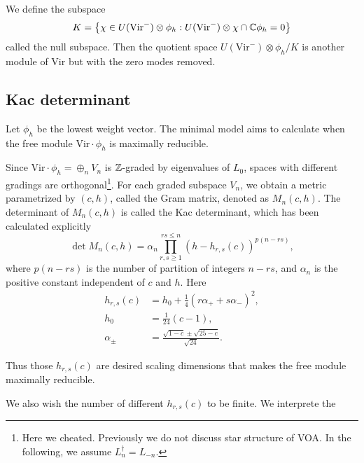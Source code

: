 \documentclass{article}
\begin{document}
We define the subspace
\[
K = \left\{\chi\in  U(\mathrm{Vir}^-)\otimes \phi_h: U(\mathrm{Vir}^-)\otimes \chi\cap \mathbb{C}\phi_h = 0\right\}
\]
called the null subspace. Then the quotient space $U(\mathrm{Vir}^-)\otimes \phi_h/K$ is another module of $\mathrm{Vir}$ but with the zero modes removed.

\subsection{Kac determinant}
Let $\phi_h$ be the lowest weight vector. The minimal model aims to calculate when the free module $\mathrm{Vir}\cdot \phi_h$ is maximally reducible. 

Since $\mathrm{Vir}\cdot \phi_h = \oplus_{n}V_n$ is $\mathbb{Z}$-graded by eigenvalues of $L_0$, spaces with different gradings are orthogonal\footnote{Here we cheated. Previously we do not discuss star structure of VOA. In the following, we assume $L_n^\dagger = L_{-n}$.}. For each graded subspace $V_n$, we obtain a metric parametrized by $(c,h)$, called the Gram matrix, denoted as $M_n(c,h)$. The determinant of $M_n(c,h)$ is called the Kac determinant, which has been calculated explicitly
\[
\det{M_n(c,h)} = \alpha_n \prod_{r,s\geq 1}^{rs\leq n}\left(h-h_{r,s}(c)\right)^{p(n-rs)},
\]
where $p(n-rs)$ is the number of partition of integers $n-rs$, and $\alpha_n$ is the positive constant independent of $c$ and $h$. Here
\begin{align*}
    h_{r,s}(c) &= h_0 + \frac{1}{4}\left(r\alpha_++s\alpha_-\right)^2,\\
    h_0 &= \frac{1}{24}(c-1),\\
    \alpha_\pm &= \frac{\sqrt{1-c}\pm \sqrt{25-c}}{\sqrt{24}}.
\end{align*}

Thus those $h_{r,s}(c)$ are desired scaling dimensions that makes the free module maximally reducible.

We also wish the number of different $h_{r,s}(c)$ to be finite. We interprete the 


\end{document}
